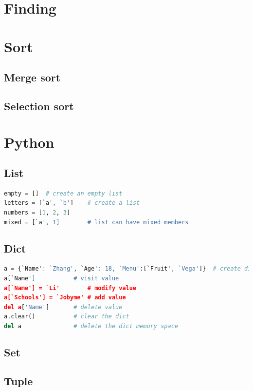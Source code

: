 \documentclass[12pt, a4paper]{report}
\begin{document}
    \section{Finding}
    
    \section{Sort}
        \subsection{Merge sort}
        \subsection{Selection sort}
    
    \section{Python}
        \subsection{List}
        \begin{lstlisting}[language=Python]
empty = [] 	# create an empty list
letters = [`a', `b']	# create a list
numbers = [1, 2, 3]
mixed = [`a', 1] 		# list can have mixed members
        \end{lstlisting}
        
        \subsection{Dict}
        \begin{lstlisting}[language=Python]
a = {`Name': `Zhang', `Age': 18, `Menu':[`Fruit', `Vega']}	# create dict
a[`Name']			# visit value
a[`Name'] = `Li'		# modify value
a[`Schools'] = `Jobyme'	# add value
del a['Name']		# delete value
a.clear()			# clear the dict
del a				# delete the dict memory space
        \end{lstlisting}
        
        
        \subsection{Set}
        
        \subsection{Tuple}
        
\end{document}
